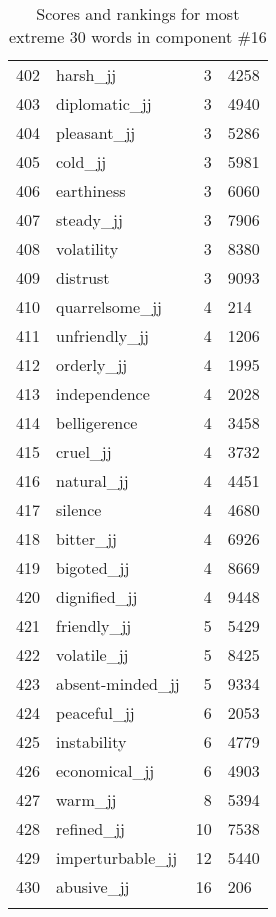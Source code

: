 \begin{longtable}[!htbp]{| rlr@{.}l |}
    402 & harsh\_jj & 3 & 4258 \\
    403 & diplomatic\_jj & 3 & 4940 \\
    404 & pleasant\_jj & 3 & 5286 \\
    405 & cold\_jj & 3 & 5981 \\
    406 & earthiness & 3 & 6060 \\
    407 & steady\_jj & 3 & 7906 \\
    408 & volatility & 3 & 8380 \\
    409 & distrust & 3 & 9093 \\
    410 & quarrelsome\_jj & 4 & 214 \\
    411 & unfriendly\_jj & 4 & 1206 \\
    412 & orderly\_jj & 4 & 1995 \\
    413 & independence & 4 & 2028 \\
    414 & belligerence & 4 & 3458 \\
    415 & cruel\_jj & 4 & 3732 \\
    416 & natural\_jj & 4 & 4451 \\
    417 & silence & 4 & 4680 \\
    418 & bitter\_jj & 4 & 6926 \\
    419 & bigoted\_jj & 4 & 8669 \\
    420 & dignified\_jj & 4 & 9448 \\
    421 & friendly\_jj & 5 & 5429 \\
    422 & volatile\_jj & 5 & 8425 \\
    423 & absent-minded\_jj & 5 & 9334 \\
    424 & peaceful\_jj & 6 & 2053 \\
    425 & instability & 6 & 4779 \\
    426 & economical\_jj & 6 & 4903 \\
    427 & warm\_jj & 8 & 5394 \\
    428 & refined\_jj & 10 & 7538 \\
    429 & imperturbable\_jj & 12 & 5440 \\
    430 & abusive\_jj & 16 & 206 \\
    \hline
    \caption{Scores and rankings for most extreme 30 words in component \#16} \\
\end{longtable}
